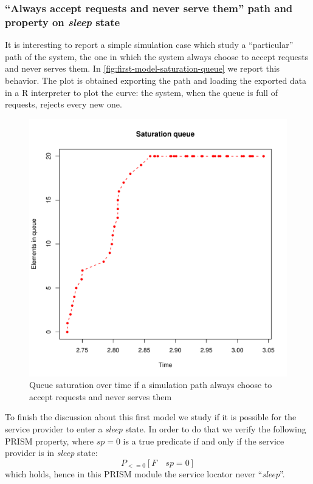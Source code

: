 \subsubsection{``Always accept requests and never serve them'' path
  and property on \emph{sleep} state}

It is interesting to report a simple simulation case which study a
``particular'' path of the system, the one in which the system always
choose to accept requests and never serves them. In
\autoref{fig:first-model-saturation-queue} we report this
behavior. The plot is obtained exporting the path and loading the
exported data in a R interpreter to plot the curve: the system, when
the queue is full of requests, rejects every new one.
\begin{figure}[htb]
  \centering
  \includegraphics[width=13cm]{quantitative-project/r-project/saturation-queue.pdf}
  \caption{Queue saturation over time if a simulation path always
    choose to accept requests and never serves them}
  \label{fig:first-model-saturation-queue}
\end{figure}

To finish the discussion about this first model we study if it is
possible for the service provider to enter a \emph{sleep} state. In
order to do that we verify the following PRISM property, where $sp=0$
is a true predicate if and only if the service provider is in
\emph{sleep} state:
\begin{displaymath}
  P_{<=0} [ F\quad sp=0 ]
\end{displaymath}
which holds, hence in this PRISM module the service locator never
``\emph{sleep}''.

